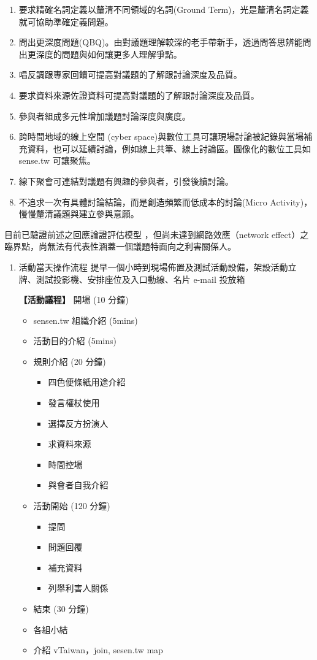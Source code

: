 \documentclass[12pt,a4paper]{article}
\begin{document}
\begin{enumerate}
\begin{enumerate}
\item 要求精確名詞定義以釐清不同領域的名詞(Ground Term)，光是釐清名詞定義就可協助準確定義問題。
\item 問出更深度問題(QBQ)。由對議題理解較深的老手帶新手，透過問答思辨能問出更深度的問題與如何讓更多人理解爭點。
\item 唱反調跟專家回饋可提高對議題的了解跟討論深度及品質。
\item 要求資料來源佐證資料可提高對議題的了解跟討論深度及品質。
\item 參與者組成多元性增加議題討論深度與廣度。
\item 跨時間地域的線上空間 (cyber space)與數位工具可讓現場討論被紀錄與當場補充資料，也可以延續討論，例如線上共筆、線上討論區。圖像化的數位工具如 sense.tw 可讓聚焦。
\item 線下聚會可連結對議題有興趣的參與者，引發後續討論。
\item 不追求一次有具體討論結論，而是創造頻繁而低成本的討論(Micro Activity)，慢慢釐清議題與建立參與意願。
\end{enumerate}

目前已驗證前述之回應論證評估模型 \citep{guba01} ，但尚未達到網路效應（network effect）之臨界點，尚無法有代表性涵蓋一個議題特面向之利害關係人。
\begin{enumerate}
\item 活動當天操作流程
\label{sec:orgd2dfb4a}
提早一個小時到現場佈置及測試活動設備，架設活動立牌、測試投影機、安排座位及入口動線、名片 e-mail 投放箱

\textbf{【活動議程】}
開場 (10 分鐘)
\begin{itemize}
\item sensen.tw 組織介紹 (5mins)
\item 活動目的介紹 (5mins)
\item 規則介紹 (20 分鐘)
\begin{itemize}
\item 四色便條紙用途介紹
\item 發言權杖使用
\item 選擇反方扮演人
\item 求資料來源
\item 時間控場
\item 與會者自我介紹
\end{itemize}
\item 活動開始 (120 分鐘)
\begin{itemize}
\item 提問
\item 問題回覆
\item 補充資料
\item 列舉利害人關係
\end{itemize}
\item 結束 (30 分鐘)
\item 各組小結
\item 介紹 vTaiwan，join, sesen.tw map
\end{itemize}


\end{enumerate}
\end{enumerate}
\end{document}
